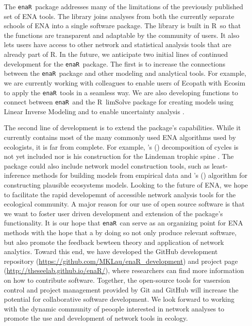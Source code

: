\documentclass[11pt]{article}
\def\citeapos#1{\citeauthor{#1}'s (\citeyear{#1})}
\newcommand{\R}{R}
\newcommand{\enaR}{\texttt{enaR}}
\begin{document}
\begin{spacing}{2}
The \enaR\ package addresses many of the limitations of the previously
published set of ENA tools. The library joins analyses from both the
currently separate schools of ENA into a single software package.
The library is built in \R\ so that the functions are transparent and
adaptable by the community of users.  It also lets users have access
to other network and statistical analysis tools that are already part
of \R. 
%
In the future, we anticipate two initial lines of continued
development for the \enaR\ package. The first is to increase the
connections between the \enaR\ package and other modeling and
analytical tools.  For example, we are currently working with
colleagues to enable users of Ecopath with Ecosim
\citep{christensen04} to apply the \enaR\ tools in a seamless way.  We
are also developing functions to connect between \enaR\ and the
\R\ limSolve package \citep{soetaert09} for creating models using
Linear Inverse Modeling and to enable uncertainty analysis
\citep{kones09}.

The second line of development is to extend the package's
capabilities.  While it currently contains most of the many commonly
used ENA algorithms used by ecologists, it is far from complete. For
example, \citeapos{ulanowicz83} decomposition of cycles is not yet
included nor is his construction for the Lindeman trophic spine
\citep{ulanowicz1979trophic}. The package could also include network
model construction tools, such as least-inference methods for building
models from empirical data \citep{ulanowicz2008least} and
\citeapos{fath04_cyber} algorithm for constructing plausible
ecosystems models.
%
Looking to the future of ENA, we hope to facilitate the rapid
developemnt of accessible network analysis tools for the ecological
community. A major reason for our use of open source software is that
we want to foster user driven development and extension of the
package's functionality. It is our hope that \enaR\ can serve as an
organizing point for ENA methods with the hope that a by doing so not
only produce relevant software, but also promote the feedback bewteen
theory and application of network analytics. Toward this end, we have
developed the GitHub development repository
(\url{https://github.com/MKLau/enaR_development}) and project page
(\url{http://theseelab.github.io/enaR/}), where researchers can find
more information on how to contribute software. Together, the
open-source tools for vasersion control and project management
provided by Git and GitHub will increase the potential for
collaborative software development. We look forward to working with
the dynamic community of peoople interested in network analyses to
promote the use and development of network tools in ecology.


\end{spacing}
\end{document}

